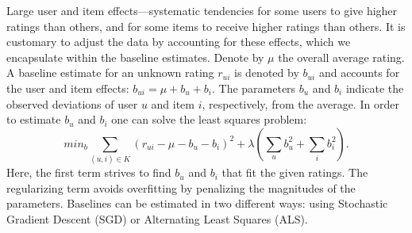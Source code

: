 Large user and item effects—systematic tendencies for some users to give higher ratings than others, and for some items to receive higher ratings than others. It is customary to adjust the data by accounting for
these effects, which we encapsulate within the baseline estimates. Denote by $\mu$ the overall average rating. A baseline estimate for an unknown rating $r_{ui}$ is denoted by $b_{ui}$ and accounts for the user and item effects: $b_{ui} = \mu + b_u + b_i$. The parameters $b_u$ and $b_i$ indicate the observed deviations of user $u$ and item $i$, respectively, from the average. In order to estimate $b_u$ and $b_i$ one can solve
the least squares problem: 
\begin{equation}
  min_{b} \sum_{(u,i)\in K} (r_{ui}-\mu-b_u-b_i)^2+\lambda(\sum_u b_u^2 +\sum_i
  b_i^2).
  \label{eq:sgd}
\end{equation}
 Here, the first term strives to find $b_u$ and $b_i$ that fit the given ratings. The regularizing term avoids overfitting by penalizing the magnitudes of the parameters. Baselines can be estimated in two different ways: using Stochastic Gradient Descent (SGD) or Alternating Least Squares (ALS).
